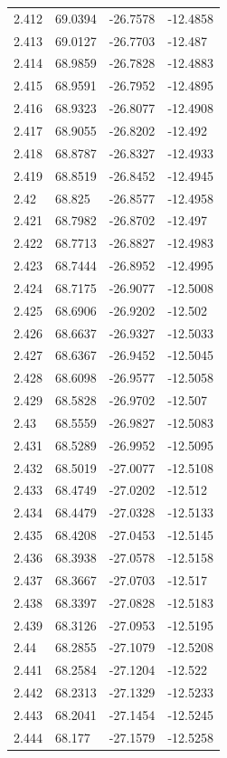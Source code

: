 \begin{tabular}{llll}
2.412 & 69.0394 & -26.7578 & -12.4858 \\
2.413 & 69.0127 & -26.7703 & -12.487 \\
2.414 & 68.9859 & -26.7828 & -12.4883 \\
2.415 & 68.9591 & -26.7952 & -12.4895 \\
2.416 & 68.9323 & -26.8077 & -12.4908 \\
2.417 & 68.9055 & -26.8202 & -12.492 \\
2.418 & 68.8787 & -26.8327 & -12.4933 \\
2.419 & 68.8519 & -26.8452 & -12.4945 \\
2.42 & 68.825 & -26.8577 & -12.4958 \\
2.421 & 68.7982 & -26.8702 & -12.497 \\
2.422 & 68.7713 & -26.8827 & -12.4983 \\
2.423 & 68.7444 & -26.8952 & -12.4995 \\
2.424 & 68.7175 & -26.9077 & -12.5008 \\
2.425 & 68.6906 & -26.9202 & -12.502 \\
2.426 & 68.6637 & -26.9327 & -12.5033 \\
2.427 & 68.6367 & -26.9452 & -12.5045 \\
2.428 & 68.6098 & -26.9577 & -12.5058 \\
2.429 & 68.5828 & -26.9702 & -12.507 \\
2.43 & 68.5559 & -26.9827 & -12.5083 \\
2.431 & 68.5289 & -26.9952 & -12.5095 \\
2.432 & 68.5019 & -27.0077 & -12.5108 \\
2.433 & 68.4749 & -27.0202 & -12.512 \\
2.434 & 68.4479 & -27.0328 & -12.5133 \\
2.435 & 68.4208 & -27.0453 & -12.5145 \\
2.436 & 68.3938 & -27.0578 & -12.5158 \\
2.437 & 68.3667 & -27.0703 & -12.517 \\
2.438 & 68.3397 & -27.0828 & -12.5183 \\
2.439 & 68.3126 & -27.0953 & -12.5195 \\
2.44 & 68.2855 & -27.1079 & -12.5208 \\
2.441 & 68.2584 & -27.1204 & -12.522 \\
2.442 & 68.2313 & -27.1329 & -12.5233 \\
2.443 & 68.2041 & -27.1454 & -12.5245 \\
2.444 & 68.177 & -27.1579 & -12.5258 \\

\end{tabular}
